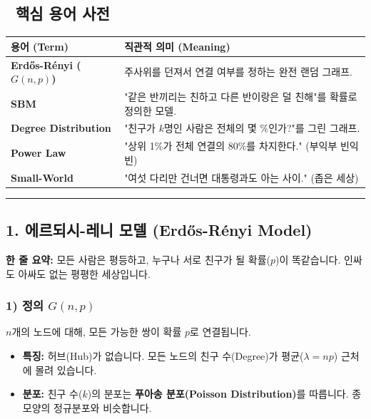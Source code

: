 \documentclass[11pt,a4paper]{book}
\theoremstyle{definition}
\begin{document}
\subsection*{📝 핵심 용어 사전}
\begin{table}[h]
\centering
\begin{tabularx}{\textwidth}{|p{}|X|}
\hline
\textbf{용어 (Term)} & \textbf{직관적 의미 (Meaning)} \\
\hline
\textbf{Erdős-Rényi ($G(n,p)$)} & 주사위를 던져서 연결 여부를 정하는 완전 랜덤 그래프. \\
\hline
\textbf{SBM} & "같은 반끼리는 친하고 다른 반이랑은 덜 친해"를 확률로 정의한 모델. \\
\hline
\textbf{Degree Distribution} & "친구가 $k$명인 사람은 전체의 몇 \%인가?"를 그린 그래프. \\
\hline
\textbf{Power Law} & "상위 1\%가 전체 연결의 80\%를 차지한다." (부익부 빈익빈) \\
\hline
\textbf{Small-World} & "여섯 다리만 건너면 대통령과도 아는 사이." (좁은 세상) \\
\hline
\end{tabularx}
\end{table}

\vspace{0.5cm}\hrule\vspace{0.5cm}

\subsection{1. 에르되시-레니 모델 (Erdős-Rényi Model)}


\begin{conceptbox}[title={개념 1: 눈 감고 선 긋기}]
\textbf{한 줄 요약:} 모든 사람은 평등하고, 누구나 서로 친구가 될 확률($p$)이 똑같습니다. 인싸도 아싸도 없는 평평한 세상입니다.
\end{conceptbox}

\subsubsection*{1) 정의 $G(n, p)$}
$n$개의 노드에 대해, 모든 가능한 쌍이 확률 $p$로 연결됩니다.
\begin{itemize}
    \item \textbf{특징:} 허브(Hub)가 없습니다. 모든 노드의 친구 수(Degree)가 평균($\lambda = np$) 근처에 몰려 있습니다.
    \item \textbf{분포:} 친구 수($k$)의 분포는 \textbf{푸아송 분포(Poisson Distribution)}를 따릅니다. 종 모양의 정규분포와 비슷합니다.
\end{itemize}
\end{document}

